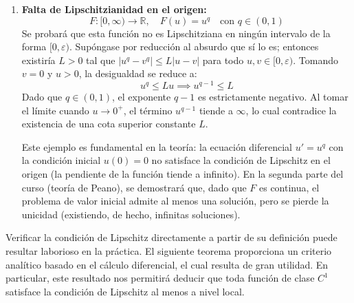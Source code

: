 {\begin{enumerate}
        Sin embargo, la función \textbf{sí es localmente Lipschitziana}. Fijado un punto $u_0 \in \mathbb{R}$ y un radio $R > 0$, para cualesquiera $u, v \in B(u_0, R)$ se cumple que $|u - u_0| < R$ y $|v - u_0| < R$. Por la desigualdad triangular, $|u| \leq |u - u_0| + |u_0| < R + |u_0|$. En consecuencia:
        \[
            |F(u) - F(v)| = |u - v| |u + v| \leq |u - v| (|u| + |v|) \leq |u - v| (2R + 2|u_0|)
        \]
        Por lo tanto, es localmente Lipschitziana en $B(u_0, R)$ con constante $L = 2(R + |u_0|)$. Como se analizará en el estudio de soluciones maximales, el hecho de que una función sea únicamente localmente Lipschitziana permite que un sistema (como $u' = u^2$) admita soluciones que dejen de estar definidas en un tiempo finito.

        \item \textbf{Falta de Lipschitzianidad en el origen:}
        \[
            F : [0, \infty) \to \mathbb{R}, \quad F(u) = u^q \quad \text{con } q \in (0, 1)
        \]
        Se probará que esta función no es Lipschitziana en ningún intervalo de la forma $[0, \varepsilon)$. 
        Supóngase por reducción al absurdo que sí lo es; entonces existiría $L > 0$ tal que $|u^q - v^q| \leq L |u - v|$ para todo $u, v \in [0, \varepsilon)$. 
        Tomando $v = 0$ y $u > 0$, la desigualdad se reduce a:
        \[
            u^q \leq L u \implies u^{q-1} \leq L
        \]
        Dado que $q \in (0, 1)$, el exponente $q - 1$ es estrictamente negativo. Al tomar el límite cuando $u \to 0^+$, el término $u^{q-1}$ tiende a $\infty$, lo cual contradice la existencia de una cota superior constante $L$. 
        
        Este ejemplo es fundamental en la teoría: la ecuación diferencial $u' = u^q$ con la condición inicial $u(0)=0$ no satisface la condición de Lipschitz en el origen (la pendiente de la función tiende a infinito). En la segunda parte del curso (teoría de Peano), se demostrará que, dado que $F$ es continua, el problema de valor inicial admite al menos una solución, pero se pierde la unicidad (existiendo, de hecho, infinitas soluciones).
    \end{enumerate}  
}

Verificar la condición de Lipschitz directamente a partir de su definición puede resultar laborioso en la práctica. El siguiente teorema proporciona un criterio analítico basado en el cálculo diferencial, el cual resulta de gran utilidad. En particular, este resultado nos permitirá deducir que toda función de clase $C^1$ satisface la condición de Lipschitz al menos a nivel local.


